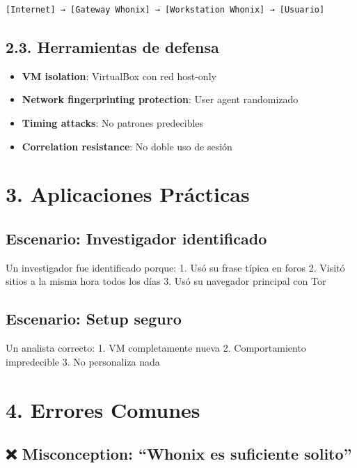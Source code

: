\documentclass[
  letterpaper,
]{report}
\providecommand{\tightlist}{%
  \setlength{\itemsep}{0pt}\setlength{\parskip}{0pt}}
\begin{document}
\begin{verbatim}
[Internet] → [Gateway Whonix] → [Workstation Whonix] → [Usuario]
\end{verbatim}

\subsection{2.3. Herramientas de defensa}\label{herramientas-de-defensa}

\begin{itemize}
\tightlist
\item
  \textbf{VM isolation}: VirtualBox con red host-only
\item
  \textbf{Network fingerprinting protection}: User agent randomizado
\item
  \textbf{Timing attacks}: No patrones predecibles
\item
  \textbf{Correlation resistance}: No doble uso de sesión
\end{itemize}

\section{3. Aplicaciones Prácticas}\label{aplicaciones-pruxe1cticas-2}

\subsection{Escenario: Investigador
identificado}\label{escenario-investigador-identificado}

Un investigador fue identificado porque: 1. Usó su frase típica en foros
2. Visitó sitios a la misma hora todos los días 3. Usó su navegador
principal con Tor

\subsection{Escenario: Setup seguro}\label{escenario-setup-seguro}

Un analista correcto: 1. VM completamente nueva 2. Comportamiento
impredecible 3. No personaliza nada

\section{4. Errores Comunes}\label{errores-comunes-1}

\subsection{❌ Misconception: ``Whonix es suficiente
solito''}\label{misconception-whonix-es-suficiente-solito}
\end{document}
